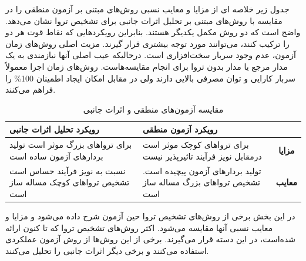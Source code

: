 
جدول زیر خلاصه ای از مزایا و معایب نسبی روش‌های مبتنی بر آزمون منطقی را در مقایسه با روش‌های مبتنی بر تحلیل اثرات جانبی برای تشخیص تروا نشان می‌دهد. واضح است که دو روش مکمل یکدیگر هستند. بنابراین رویکردهایی که نقاط قوت هر دو را ترکیب کنند، می‌توانند مورد توجه بیشتری قرار گیرند. مزیت اصلی روش‌های زمان آزمون، عدم وجود سربار سخت‌افزاری است. درحالیکه عیب اصلی آنها نیازمندی به یک مدار مرجع یا مدار بدون تروا برای انجام مقایسه‌هاست. روش‌های زمان اجرا معمولاً سربار کارایی و توان مصرفی بالایی دارند ولی در مقابل امکان ایجاد اطمینان 100\% را فراهم می‌کنند. 
	 \begin{table}[t]
	 \label{tcomparisonls}
\caption{مقایسه آزمون‌های منطقی و اثرات جانبی}
\begin{center}

    \begin{tabular}{| p{4cm} | p{4cm} || c |}

    \hline
    \textbf{رویکرد تحلیل اثرات جانبی} & \textbf{رویکرد آزمون منطقی} & \\ \hline \hline
    برای تروا‌های بزرگ موثر است تولید بردارهای آزمون ساده است & برای تروا‌های کوچک موثر است درمقابل نویز فرآیند تاثیرپذیر نیست &\textbf{ مزایا}  \\ \hline
    نسبت به نویز فرآیند حساس است تشخیص تروا‌های کوچک مساله ساز است & تولید بردارهای آزمون پیچیده است. تشخیص تروا‌های بزرگ مساله ساز است & \textbf{معایب}  \\ \hline
    
    \end{tabular}

\end{center}
\end{table}


در این بخش برخی از روش‌های تشخیص تروا حین آزمون شرح داده می‌شود و مزایا و معایب نسبی آنها مقایسه می‌شود. اکثر روش‌های تشخیص تروا که تا کنون ارائه شده‌است، در این دسته قرار می‌گیرند.  برخی از این روش‌ها از روش آزمون عملکردی استفاده می‌کنند و برخی دیگر اثرات جانبی را تحلیل می‌کنند.


%

